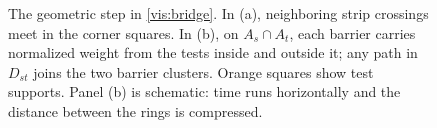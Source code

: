 \begin{figure}[tbp]
\caption{The geometric step in \eqref{vis:bridge}.
In (a), neighboring strip crossings meet in the corner squares.
In (b), on $A_s\cap A_t$, each barrier carries normalized weight
from the tests inside and outside it; any path in $D_{st}$ joins the
two barrier clusters.  Orange squares show test supports.  Panel (b)
is schematic: time runs horizontally and the distance between the
rings is compressed.}
\label{fig:circuits}
\end{figure}
